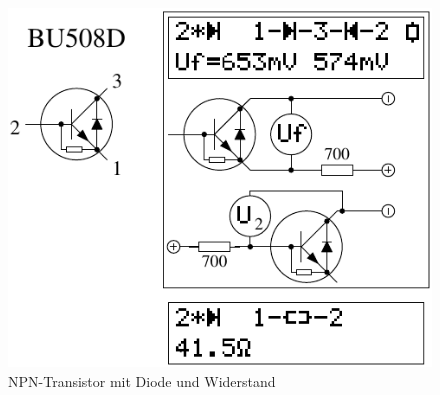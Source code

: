 \begin{figure}[H]
\centering
\includegraphics[width=.8\textwidth]{../FIG/BJT_BU508D.pdf}
\caption{NPN-Transistor mit Diode und Widerstand}
\label{fig:BJT-NPN-Di-R}
\end{figure}

